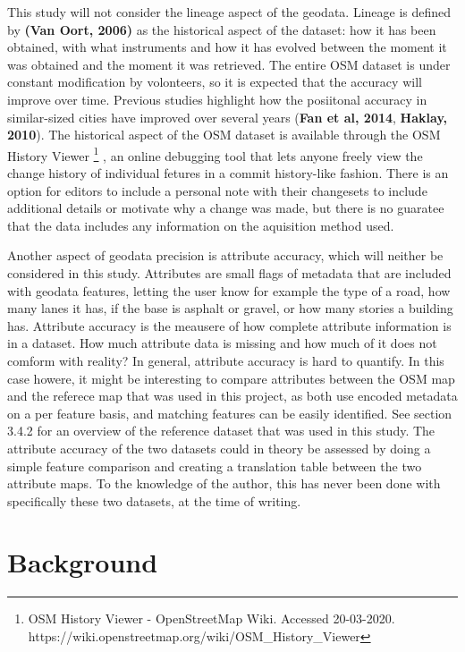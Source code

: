 \documentclass{kththesis}
\begin{document}
This study will not consider the lineage aspect of the geodata.
Lineage is defined by \textbf{(Van Oort, 2006)} as the historical aspect of the dataset: how it has been obtained, with what instruments and how it has evolved between the moment it was obtained and the moment it was retrieved.
The entire OSM dataset is under constant modification by volonteers, so it is expected that the accuracy will improve over time. Previous studies highlight how the posiitonal accuracy in similar-sized cities have improved over several years (\textbf{Fan et al, 2014}, \textbf{Haklay, 2010}).
The historical aspect of the OSM dataset is available through the OSM History Viewer
\footnote{OSM History Viewer - OpenStreetMap Wiki. Accessed 20-03-2020. https://wiki.openstreetmap.org/wiki/OSM\_History\_Viewer}
, an online debugging tool that lets anyone freely view the change history of individual fetures in a commit history-like fashion.
There is an option for editors to include a personal note with their changesets to include additional details or motivate why a change was made, but there is no guaratee that the data includes any information on the aquisition method used.

Another aspect of geodata precision is attribute accuracy, which will neither be considered in this study.
Attributes are small flags of metadata that are included with geodata features, letting the user know for example the type of a road, how many lanes it has, if the base is asphalt or gravel, or how many stories a building has.
Attribute accuracy is the meausere of how complete attribute information is in a dataset.
How much attribute data is missing and how much of it does not comform with reality?
In general, attribute accuracy is hard to quantify.
In this case howere, it might be interesting to compare attributes between the OSM map and the referece map that was used in this project, as both use encoded metadata on a per feature basis, and matching features can be easily identified.
See section 3.4.2 for an overview of the reference dataset that was used in this study.
The attribute accuracy of the two datasets could in theory be assessed by doing a simple feature comparison and creating a translation table between the two attribute maps.
To the knowledge of the author, this has never been done with specifically these two datasets, at the time of writing.

\chapter{Background}
\end{document}
